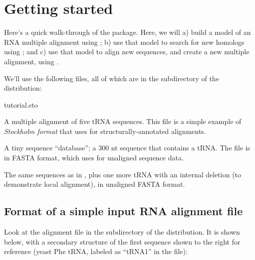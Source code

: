 \section{Getting started}

Here's a quick walk-through of the package. Here, we will
a) build a model of an RNA multiple alignment using
         ;
b) use that model to search for new homologs using
         ;
and c) use that model to align new sequences, and create a 
         new multiple alignment, using .

We'll use the following files, all of which are in the 
subdirectory of the distribution:

  \begin{sreitems}{tutorial.sto}
  \item[\prog{tutorial.sto}] A multiple alignment of five tRNA
       sequences. This file is a simple example of \emph{Stockholm
       format} that  uses for structurally-annotated alignments.
  \item[\prog{tutorial.db}]  A tiny sequence ``database''; a 300 nt sequence
       that contains a tRNA. The file is
       in FASTA format, which  uses for unaligned sequence
       data.
  \item[\prog{tutorial.fa}] The same sequences as in , plus
       one more tRNA with an internal deletion (to demonstrate local alignment),
       in unaligned FASTA format.
  \end{sreitems}

\subsection{Format of a simple input RNA alignment file}

Look at the alignment file  in the 
subdirectory of the  distribution. It is shown
below, with a secondary structure of the first sequence shown to the
right for reference (yeast Phe tRNA, labeled as ``tRNA1'' in the
file):

